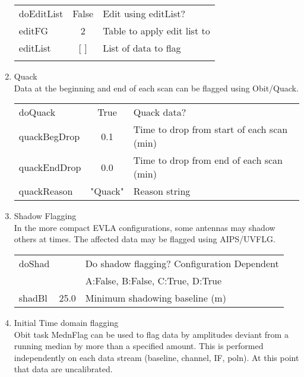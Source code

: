 \documentclass[11pt]{article}
\begin{document}
\begin{enumerate}
\begin{center}
\begin{tabular}{|l|c|l|}
\hline
doEditList  & False & Edit using editList? \\
editFG      & 2     & Table to apply edit list to\\
 editList   & [ ]   & List of data to flag \\
  &  &  \\
\hline
\end{tabular}
\end{center}
%
\item Quack\\
Data at the beginning and end of each scan can be flagged using
Obit/Quack. 
\begin{center}
\begin{tabular}{|l|c|l|}
\hline
doQuack       & True    & Quack data? \\
quackBegDrop  & 0.1     & Time to drop from start of each scan (min) \\
quackEndDrop  & 0.0     & Time to drop from end of each scan (min) \\
quackReason   & "Quack" & Reason string \\
\hline
\end{tabular}
\end{center}
%
\item Shadow Flagging \\
In the more compact EVLA configurations, some antennas may shadow
others at times.
The affected data may be flagged using AIPS/UVFLG.
\begin{center}
\begin{tabular}{|l|c|l|}
\hline
doShad  &      & Do shadow flagging? Configuration Dependent \\
        &      & A:False, B:False, C:True, D:True\\
shadBl  & 25.0 &  Minimum shadowing baseline (m)\\
\hline
\end{tabular}
\end{center}
%
\item Initial Time domain flagging\\
Obit task MednFlag can be used to flag data by amplitudes deviant from
a running median by more than a specified amount.
This is performed independently on each data stream (baseline,
channel, IF, poln).
At this point that data are uncalibrated.
\begin{center}
\begin{tabular}{|l|c|l|}

\end{tabular}
\end{center}
\end{enumerate}
\end{document}
